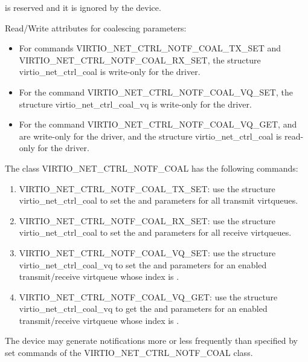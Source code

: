  is reserved and it is ignored by the device.

Read/Write attributes for coalescing parameters:
\begin{itemize}
\item For commands VIRTIO_NET_CTRL_NOTF_COAL_TX_SET and VIRTIO_NET_CTRL_NOTF_COAL_RX_SET, the structure virtio_net_ctrl_coal is write-only for the driver.
\item For the command VIRTIO_NET_CTRL_NOTF_COAL_VQ_SET, the structure virtio_net_ctrl_coal_vq is write-only for the driver.
\item For the command VIRTIO_NET_CTRL_NOTF_COAL_VQ_GET,  and  are write-only
      for the driver, and the structure virtio_net_ctrl_coal is read-only for the driver.
\end{itemize}

The class VIRTIO_NET_CTRL_NOTF_COAL has the following commands:
\begin{enumerate}
\item VIRTIO_NET_CTRL_NOTF_COAL_TX_SET: use the structure virtio_net_ctrl_coal to set the  and  parameters for all transmit virtqueues.
\item VIRTIO_NET_CTRL_NOTF_COAL_RX_SET: use the structure virtio_net_ctrl_coal to set the  and  parameters for all receive virtqueues.
\item VIRTIO_NET_CTRL_NOTF_COAL_VQ_SET: use the structure virtio_net_ctrl_coal_vq to set the  and  parameters
                                        for an enabled transmit/receive virtqueue whose index is .
\item VIRTIO_NET_CTRL_NOTF_COAL_VQ_GET: use the structure virtio_net_ctrl_coal_vq to get the  and  parameters
                                        for an enabled transmit/receive virtqueue whose index is .
\end{enumerate}

The device may generate notifications more or less frequently than specified by set commands of the VIRTIO_NET_CTRL_NOTF_COAL class.

